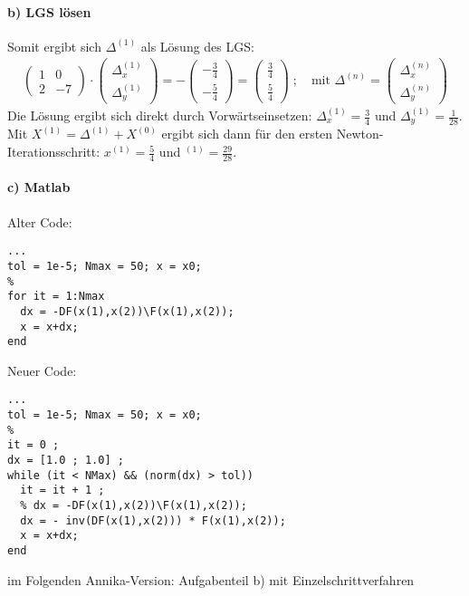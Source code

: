 \paragraph*{b) LGS lösen}
Somit ergibt sich $\Delta^{(1)}$ als Lösung des LGS:
\begin{align*}
  \begin{pmatrix}1 & 0 \\ 2 & -7\end{pmatrix} \cdot
  \begin{pmatrix}\Delta_x^{(1)} \\ \Delta_y^{(1)}\end{pmatrix} =
  - \begin{pmatrix}-\frac{3}{4} \\ -\frac{5}{4}\end{pmatrix} =
  \begin{pmatrix}\frac{3}{4} \\ \frac{5}{4}\end{pmatrix} \; ; \quad
  \text{mit } \Delta^{(n)} = \begin{pmatrix}\Delta_x^{(n)} \\\Delta_y^{(n)}\end{pmatrix}
\end{align*}
Die Lösung ergibt sich direkt durch Vorwärtseinsetzen: $\Delta_x^{(1)} = \frac{3}{4}$
und $\Delta_y^{(1)} = \frac{1}{28}$. Mit $X^{(1)} = \Delta^{(1)} + X^{(0)}$ ergibt sich dann
für den ersten Newton-Iterationsschritt:
$x^{(1)} = \frac{5}{4}$ und $^{(1)} = \frac{29}{28}$.

\paragraph*{c) Matlab}
Alter Code:
\begin{verbatim}
...
tol = 1e-5; Nmax = 50; x = x0;
%
for it = 1:Nmax
  dx = -DF(x(1),x(2))\F(x(1),x(2));
  x = x+dx;
end
\end{verbatim}
Neuer Code:
\begin{verbatim}
...
tol = 1e-5; Nmax = 50; x = x0;
%
it = 0 ;
dx = [1.0 ; 1.0] ;
while (it < NMax) && (norm(dx) > tol))
  it = it + 1 ;
  % dx = -DF(x(1),x(2))\F(x(1),x(2));
  dx = - inv(DF(x(1),x(2))) * F(x(1),x(2));
  x = x+dx;
end
\end{verbatim}

im Folgenden Annika-Version: Aufgabenteil b) mit Einzelschrittverfahren
